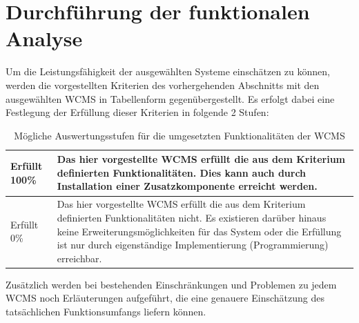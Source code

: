 \section{Durchführung der funktionalen Analyse}
Um die Leistungsfähigkeit der ausgewählten Systeme einschätzen zu können, werden die vorgestellten Kriterien des vorhergehenden Abschnitts mit den ausgewählten WCMS in Tabellenform gegenübergestellt. Es erfolgt dabei eine Festlegung der Erfüllung dieser Kriterien in folgende 2 Stufen:

\begin{table}[!h]
\renewcommand{\arraystretch}{1.5}
\center
\caption{Mögliche Auswertungsstufen für die umgesetzten Funktionalitäten der WCMS}
\begin{tabular}{|l|p{10cm}|}
\hline
\cellcolor{green} Erfüllt 100\% & Das hier vorgestellte WCMS erfüllt die aus dem
Kriterium definierten Funktionalitäten. Dies kann auch durch Installation einer Zusatzkomponente erreicht werden.\\
\hline
\cellcolor{red} Erfüllt 0\% & Das hier vorgestellte WCMS erfüllt die aus dem
Kriterium definierten Funktionalitäten nicht. Es existieren darüber hinaus keine Erweiterungsmöglichkeiten für das System oder die Erfüllung ist nur durch eigenständige Implementierung (Programmierung) erreichbar.\\
\hline
\end{tabular}
\end{table}
\newpage

Zusätzlich werden bei bestehenden Einschränkungen und Problemen zu jedem WCMS noch Erläuterungen aufgeführt, die eine genauere Einschätzung des tatsächlichen Funktionsumfangs liefern können.
